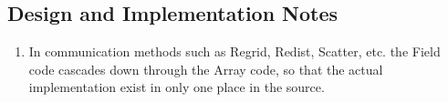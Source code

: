 

\subsection{Design and Implementation Notes}

\begin{enumerate}

\item In communication methods such as Regrid, Redist, Scatter, etc. 
the Field code cascades down through the Array code, so 
that the actual implementation exist in only one place in the source.

\end{enumerate}
